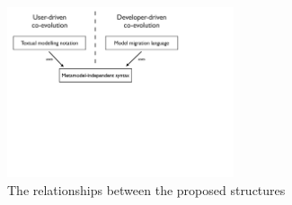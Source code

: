 \begin{figure}[htbp]
	\centering
		\includegraphics*[viewport=0 400 800 800,height=5cm]{5.Implementation/images/implementation_structure.pdf}
	\caption{The relationships between the proposed structures}
	\label{fig:implementation_structure}
\end{figure}


